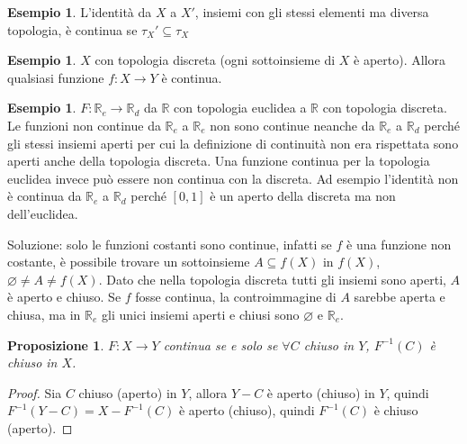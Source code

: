 \documentclass{article}
\newcounter{theo}[section]\setcounter{theo}{0}
\newcounter{excounter}[section]\setcounter{excounter}{0}
\theoremstyle{plain}
\newtheorem{proposition}[theo]{Proposizione}
\theoremstyle{definition}
\newtheorem{example}[excounter]{Esempio}
\theoremstyle{remark}
\begin{document}
\begin{example}
    L'identità da \(X\) a \(X'\), insiemi con gli stessi elementi ma diversa
    topologia, è continua se \(\tau_X' \subseteq \tau_X\) 
\end{example}
\begin{example}
    \(X\) con topologia discreta (ogni sottoinsieme di \(X\) è aperto).
    Allora qualsiasi funzione \(f: X \to Y\) è continua.
\end{example}
\begin{example}
    \(F: \mathbb{R}_e \to \mathbb{R}_d\) da $\mathbb{R}$ con topologia euclidea a
    \(\mathbb{R}\) con topologia discreta. Le funzioni non continue da
    \(\mathbb{R}_e\) a \(\mathbb{R}_e\) non sono continue neanche da
    \(\mathbb{R}_e\) a \(\mathbb{R}_d\) perché gli stessi insiemi aperti per cui
    la definizione di continuità non era rispettata sono aperti anche
    della topologia discreta. Una funzione continua per la topologia euclidea
    invece può essere non continua con la discreta. Ad esempio l'identità
    non è continua da \(\mathbb{R}_e\) a \(\mathbb{R}_d\) perché \([0, 1]\) è un aperto della discreta ma non
    dell'euclidea.

    Soluzione: solo le funzioni costanti sono continue, infatti se \(f\) è una
    funzione non costante, è possibile trovare un sottoinsieme \(A \subseteq f(X)\) in
    \(f(X)\), \(\varnothing \neq A \neq f(X)\). Dato che nella
    topologia discreta tutti gli insiemi sono aperti, \(A\) è aperto
    e chiuso. Se \(f\) fosse continua, la controimmagine di \(A\) sarebbe aperta
    e chiusa, ma in \(\mathbb{R}_e\) gli unici insiemi aperti e chiusi sono
    \(\varnothing \text{ e } \mathbb{R}_e\).
    
\end{example}

\begin{proposition}
    \(F: X \to Y\) continua se e solo se \(\forall C\) chiuso in \(Y\),
    \(F^{-1}(C)\) è chiuso in \(X\).
\end{proposition}
\begin{proof}
    Sia \(C\) chiuso (aperto) in \(Y\), allora \(Y - C\) è aperto (chiuso)
        in \(Y\), quindi \(F^{-1}(Y - C) = X - F^{-1}(C)\) è aperto (chiuso), quindi
        \(F^{-1}(C)\) è chiuso (aperto).
\end{proof}
\end{document}
